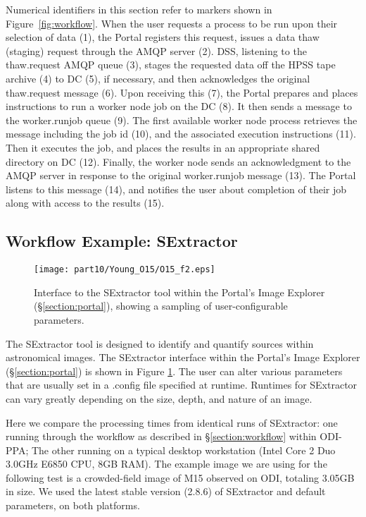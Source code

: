 Numerical identifiers in this section refer to markers shown in Figure~\ref{fig:workflow}.  When the user requests a process to be run upon their selection of data (1), the Portal registers this request, issues a data thaw (staging) request through the AMQP server (2).  DSS, listening to the thaw.request AMQP queue (3), stages the requested data off the HPSS tape archive (4) to DC (5), if necessary, and then acknowledges the original thaw.request message (6).  Upon receiving this (7), the Portal prepares and places instructions to run a worker node job on the DC (8).  It then sends a message to the worker.runjob queue (9).   The first available worker node process retrieves the message including the job id (10), and the associated execution instructions (11). Then it executes the job, and places the results in an appropriate shared directory on DC (12).  Finally, the worker node sends an acknowledgment to the AMQP server in response to the original worker.runjob message (13). The Portal listens to this message (14), and notifies the user about completion of their job along with access to the results (15).  

\subsection{Workflow Example: SExtractor}
\label{section:sextractor}

\begin{figure}[ht]
\texttt{[image: part10/Young\_O15/O15\_f2.eps]}
\caption{Interface to the SExtractor tool within the Portal's Image Explorer (\S\ref{section:portal}), showing a sampling of user-configurable parameters.}
\label{fig:sextractor}
\end{figure}

The SExtractor tool is designed to identify and quantify sources within astronomical images.  The SExtractor interface within the Portal's Image Explorer (\S\ref{section:portal}) is shown in Figure \ref{fig:sextractor}.  The user can alter various parameters that are usually set in a .config file specified at runtime.  Runtimes for SExtractor can vary greatly depending on the size, depth, and nature of an image.  

Here we compare the processing times from identical runs of SExtractor: one running through the workflow as described in \S\ref{section:workflow} within ODI-PPA; The other running on a typical desktop workstation (Intel Core 2 Duo 3.0GHz E6850 CPU, 8GB RAM). The example image we are using for the following test is a crowded-field image of M15 observed on ODI, totaling 3.05GB in size. We used the latest stable version (2.8.6) of SExtractor and default parameters, on both platforms.

